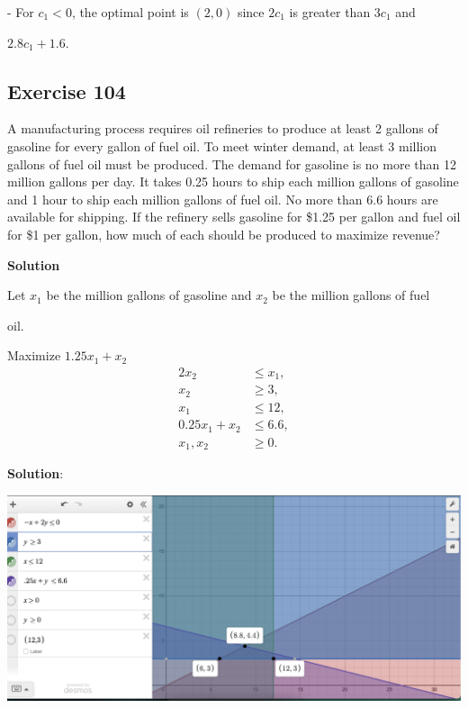 \documentclass{article}
\begin{document}
- For \( c_1 < 0 \), the optimal point is \( (2, 0) \) since \( 2c_1 \) is greater than \( 3c_1 \) and 

\( 2.8c_1 + 1.6 \).




\subsection*{Exercise 104}
A manufacturing process requires oil refineries to produce at least 2 gallons of gasoline for every gallon of fuel oil. To meet winter demand, at least 3 million gallons of fuel oil must be produced. The demand for gasoline is no more than 12 million gallons per day. It takes 0.25 hours to ship each million gallons of gasoline and 1 hour to ship each million gallons of fuel oil. No more than 6.6 hours are available for shipping. If the refinery sells gasoline for \$1.25 per gallon and fuel oil for \$1 per gallon, how much of each should be produced to maximize revenue?

\vspace{\baselineskip}

\textbf{Solution}

Let \( x_1 \) be the million gallons of gasoline and \( x_2 \) be the million gallons of fuel 

oil.

Maximize \( 1.25x_1 + x_2 \)
\[
\begin{aligned}
    2x_2 &\leq x_1, \\
    x_2 &\geq 3, \\
    x_1 &\leq 12, \\
    0.25x_1 + x_2 &\leq 6.6, \\
    x_1, x_2 &\geq 0.
\end{aligned}
\]

\textbf{Solution}:

\begin{center}
    \includegraphics[width=1.2\textwidth]{Ex104.png}
\end{center}
\end{document}
